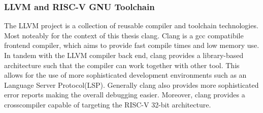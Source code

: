 \subsubsection{LLVM and RISC-V GNU Toolchain}
The LLVM project is a collection of reusable compiler and toolchain
technologies. Most noteably for the context of this thesis clang. Clang is a gcc
compatibile frontend compiler, which aims to provide fast compile times and low
memory use. In tandem with the LLVM compiler back end, clang provides a
library-based architecture such that the compiler can work together with other
tool. This allows for the use of more sophisticated development environments
such as an Language Server Protocol(LSP). Generally clang also provides more
sophisticated error reports making the overall debugging easier. Moreover, clang
provides a crosscompiler capable of targeting the RISC-V 32-bit architecture.





